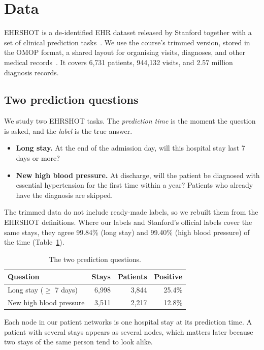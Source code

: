\section{Data}
\label{sec:data}

EHRSHOT is a de-identified EHR dataset released by Stanford together with a set of clinical prediction tasks~\cite{wornow2023ehrshot}. We use the course's trimmed version, stored in the OMOP format, a shared layout for organising visits, diagnoses, and other medical records~\cite{hripcsak2015ohdsi}. It covers 6,731 patients, 944,132 visits, and 2.57 million diagnosis records.

\subsection{Two prediction questions}

We study two EHRSHOT tasks. The \emph{prediction time} is the moment the question is asked, and the \emph{label} is the true answer.
\begin{itemize}
  \item \textbf{Long stay.} At the end of the admission day, will this hospital stay last 7 days or more?
  \item \textbf{New high blood pressure.} At discharge, will the patient be diagnosed with essential hypertension for the first time within a year? Patients who already have the diagnosis are skipped.
\end{itemize}
The trimmed data do not include ready-made labels, so we rebuilt them from the EHRSHOT definitions. Where our labels and Stanford's official labels cover the same stays, they agree 99.84\% (long stay) and 99.40\% (high blood pressure) of the time (Table~\ref{tab:labels}).

\begin{table}[!htbp]
\centering
\caption{The two prediction questions.}
\label{tab:labels}
\small
\begin{tabular}{lrrr}
\toprule
Question & Stays & Patients & Positive \\
\midrule
Long stay ($\geq$ 7 days) & 6,998 & 3,844 & 25.4\% \\
New high blood pressure   & 3,511 & 2,217 & 12.8\% \\
\bottomrule
\end{tabular}
\end{table}

Each node in our patient networks is one hospital stay at its prediction time. A patient with several stays appears as several nodes, which matters later because two stays of the same person tend to look alike.

